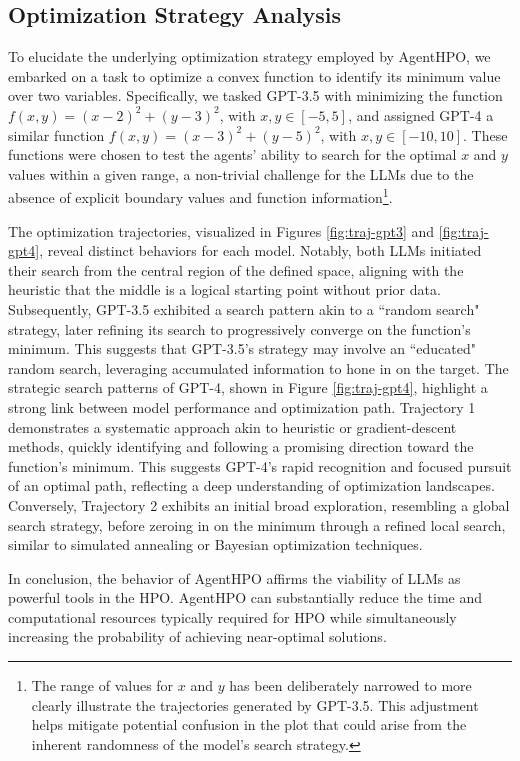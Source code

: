 \documentclass{article}
\begin{document}
\subsection{Optimization Strategy Analysis}

To elucidate the underlying optimization strategy employed by AgentHPO, we embarked on a task to optimize a convex function to identify its minimum value over two variables. Specifically, we tasked GPT-3.5 with minimizing the function \( f(x, y) = (x-2)^2 + (y-3)^2 \), with \( x, y \in [-5, 5] \), and assigned GPT-4 a similar function \( f(x, y) = (x-3)^2 + (y-5)^2 \), with \( x, y \in [-10, 10] \). These functions were chosen to test the agents' ability to search for the optimal \( x \) and \( y \) values within a given range, a non-trivial challenge for the LLMs due to the absence of explicit boundary values and function information\footnote{The range of values for \(x\) and \(y\) has been deliberately narrowed to more clearly illustrate the trajectories generated by GPT-3.5. This adjustment helps mitigate potential confusion in the plot that could arise from the inherent randomness of the model's search strategy.}.

The optimization trajectories, visualized in Figures \ref{fig:traj-gpt3} and \ref{fig:traj-gpt4}, reveal distinct behaviors for each model. Notably, both LLMs initiated their search from the central region of the defined space, aligning with the heuristic that the middle is a logical starting point without prior data. Subsequently, GPT-3.5 exhibited a search pattern akin to a ``random search" strategy, later refining its search to progressively converge on the function's minimum. This suggests that GPT-3.5's strategy may involve an ``educated" random search, leveraging accumulated information to hone in on the target. The strategic search patterns of GPT-4, shown in Figure \ref{fig:traj-gpt4}, highlight a strong link between model performance and optimization path. Trajectory 1 demonstrates a systematic approach akin to heuristic or gradient-descent methods, quickly identifying and following a promising direction toward the function's minimum. This suggests GPT-4's rapid recognition and focused pursuit of an optimal path, reflecting a deep understanding of optimization landscapes. Conversely, Trajectory 2 exhibits an initial broad exploration, resembling a global search strategy, before zeroing in on the minimum through a refined local search, similar to simulated annealing or Bayesian optimization techniques.

In conclusion, the behavior of AgentHPO affirms the viability of LLMs as powerful tools in the HPO. AgentHPO can substantially reduce the time and computational resources typically required for HPO while simultaneously increasing the probability of achieving near-optimal solutions.
\end{document}
